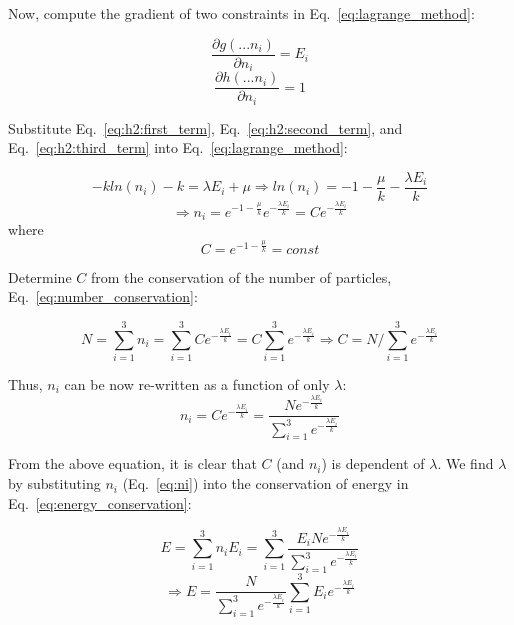 \documentclass{article}
\begin{document}
Now, compute the gradient of two constraints in Eq.~\eqref{eq:lagrange_method}:

\begin{equation} \label{eq:h2:second_term}
  \frac{\partial g(...n_i)}{\partial n_i} = E_i
\end{equation}
\begin{equation} \label{eq:h2:third_term}
  \frac{\partial h(...n_i)}{\partial n_i} = 1
\end{equation}

Substitute Eq.~\eqref{eq:h2:first_term}, Eq.~\eqref{eq:h2:second_term}, and Eq.~\eqref{eq:h2:third_term} into Eq.~\eqref{eq:lagrange_method}:

\begin{equation*}
  -kln(n_i) - k = \lambda E_i + \mu \Rightarrow ln(n_i) = -1 - \frac{\mu}{k} - \frac{\lambda E_i}{k} 
\end{equation*}
\begin{equation}
  \Rightarrow n_i = e^{-1-\frac{\mu}{k}}e^{-\frac{\lambda E_i}{k}} = Ce^{-\frac{\lambda E_i}{k}}
\end{equation} where
\begin{equation*}
  C = e^{-1-\frac{\mu}{k}} = const
\end{equation*}

Determine $C$ from the conservation of the number of particles, Eq.~\eqref{eq:number_conservation}:

\begin{equation*}
    N = \sum_{i=1}^{3}{n_i} = \sum_{i=1}^{3}{ Ce^{-\frac{\lambda E_i}{k}} } =  C \sum_{i=1}^{3}{ e^{-\frac{\lambda E_i}{k}} } \Rightarrow C = N / \sum_{i=1}^{3}{ e^{-\frac{\lambda E_i}{k}} }
\end{equation*}

Thus, $n_i$ can be now re-written as a function of only $\lambda$:
\begin{equation} \label{eq:ni}
  n_i = Ce^{-\frac{\lambda E_i}{k}} = \frac{N e^{-\frac{\lambda E_i}{k}}}{\sum_{i=1}^{3} e^{-\frac{\lambda E_i}{k}}}
\end{equation}

From the above equation, it is clear that $C$ (and $n_i$) is dependent of $\lambda$. We find $\lambda$ by substituting $n_i$ (Eq.~\eqref{eq:ni}) into the conservation of energy in Eq.~\eqref{eq:energy_conservation}:

\begin{equation*}
  E = \sum_{i=1}^{3}{n_iE_i} = \sum_{i=1}^{3}{\frac{E_i N e^{-\frac{\lambda E_i}{k}}}{\sum_{i=1}^{3} e^{-\frac{\lambda E_i}{k}}}}
\end{equation*}
\begin{equation} \label{eq:lambda_equation}
  \Rightarrow E = \frac{N}{\sum_{i=1}^{3} e^{-\frac{\lambda E_i}{k}}} \sum_{i=1}^{3}{ E_ie^{-\frac{\lambda E_i}{k}}}
\end{equation}
\end{document}
